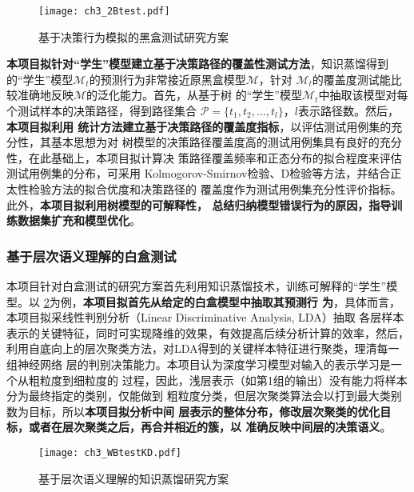 \begin{figure}[htp]
    \begin{small}
        \begin{center}
            \texttt{[image: ch3\_2Btest.pdf]}
        \end{center}
        \caption{基于决策行为模拟的黑盒测试研究方案}
        \label{fig:ch3:2Btest}
    \end{small}
\end{figure}

\textbf{本项目拟针对``学生''模型建立基于决策路径的覆盖性测试方法}，知识蒸馏得到
的``学生''模型$\mathcal M_t$的预测行为非常接近原黑盒模型$\mathcal M$，针对
$\mathcal M_t$的覆盖度测试能比较准确地反映$\mathcal M$的泛化能力。首先，从基于树
的``学生''模型$\mathcal M_t$中抽取该模型对每个测试样本的决策路径，得到路径集合
$\mathcal P=\{t_1, t_2,\dots, t_l\}$，$l$表示路径数。然后，\textbf{本项目拟利用
统计方法建立基于决策路径的覆盖度指标}，以评估测试用例集的充分性，其基本思想为对
树模型的决策路径覆盖度高的测试用例集具有良好的充分性，在此基础上，本项目拟计算决
策路径覆盖频率和正态分布的拟合程度来评估测试用例集的分布，可采用
Kolmogorov-Smirnov检验、D检验等方法，并结合正太性检验方法的拟合优度和决策路径的
覆盖度作为测试用例集充分性评价指标。此外，\textbf{本项目拟利用树模型的可解释性，
总结归纳模型错误行为的原因，指导训练数据集扩充和模型优化}。

\subsubsection{基于层次语义理解的白盒测试}\label{ch3_2}

本项目针对白盒测试的研究方案首先利用知识蒸馏技术，训练可解释的``学生''模型。以
\cref{fig:ch3:WBtestKD}为例，\textbf{本项目拟首先从给定的白盒模型中抽取其预测行
为}，具体而言，本项目拟采线性判别分析（Linear Discriminative Analysis, LDA）抽取
各层样本表示的关键特征，同时可实现降维的效果，有效提高后续分析计算的效率，然后，
利用自底向上的层次聚类方法，对LDA得到的关键样本特征进行聚类，理清每一组神经网络
层的判别决策能力。本项目认为深度学习模型对输入的表示学习是一个从粗粒度到细粒度的
过程，因此，浅层表示（如第1组的输出）没有能力将样本分为最终指定的类别，仅能做到
粗粒度分类，但层次聚类算法会以打到最大类别数为目标，所以\textbf{本项目拟分析中间
层表示的整体分布，修改层次聚类的优化目标，或者在层次聚类之后，再合并相近的簇，以
准确反映中间层的决策语义}。

\begin{figure}[htp]
    \begin{small}
        \begin{center}
            \texttt{[image: ch3\_WBtestKD.pdf]}
        \end{center}
        \caption{基于层次语义理解的知识蒸馏研究方案}
        \label{fig:ch3:WBtestKD}
    \end{small}
\end{figure}

